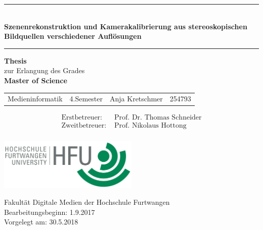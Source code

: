 \begin{titlepage}
\thispagestyle{empty}

\begin{center}
	\enlargethispage{3\baselineskip}
	\hrule
	
	\begin{center} \LARGE \textbf{\\Szenenrekonstruktion und Kamerakalibrierung aus stereoskopischen Bildquellen verschiedener Auflösungen}
	\end{center}
	
	\vspace{0.5cm}
	
	\hrule
	
	\vspace{2.5cm}
	
	{\Large \textbf{Thesis}\\ zur Erlangung des Grades\\[2ex]
	\textbf{Master of Science}}
	
	\vspace{3cm}
	
	\begin{tabular}{l l l l}
		Medieninformatik &4.Semester &Anja Kretschmer &254793 \vspace{0.2cm} \\	
	\end{tabular}
	
	\vspace{1cm}
	
	\begin{align*}
	\text{Erstbetreuer: }  &\text{Prof. Dr. Thomas Schneider}\\
	\text{Zweitbetreuer: }  &\text{Prof. Nikolaus Hottong}\\
	\end{align*}	
	
	\vspace{1.0cm}
	
	
	\vspace{1.5cm}
	\includegraphics[width=0.5\textwidth]{./images/hfu_logo.png}

	Fakultät Digitale Medien der Hochschule Furtwangen\\[1ex]
	Bearbeitungsbeginn: 1.9.2017\\
	Vorgelegt am: 30.5.2018 

\end{center}

\end{titlepage}